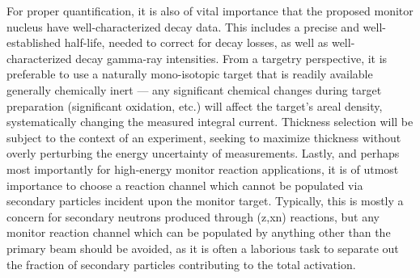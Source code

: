 \documentclass[3p]{elsarticle}
\newcommand{\comment}[1]{\todo[color=blue!20!white,inline]{ASV: #1}}
\begin{document}
For proper quantification, it is also of vital importance that the proposed monitor nucleus have well-characterized decay data.
This includes a precise and well-established half-life,  needed to  correct for decay losses, as well as well-characterized decay gamma-ray intensities.
From a targetry  perspective, it is preferable to use a naturally mono-isotopic target that is readily available
generally chemically inert --- any significant chemical changes during target preparation (significant oxidation, etc.) will affect the target's areal density, systematically changing the measured integral current. 
Thickness selection will be subject to the context of an experiment, seeking to maximize thickness without overly perturbing the energy uncertainty of  measurements.
Lastly, and perhaps most importantly for high-energy monitor reaction applications, it is  of utmost importance to choose a reaction channel which cannot be populated via secondary particles incident upon the monitor target.
Typically, this is  mostly a concern for secondary neutrons produced through (z,xn) reactions, 
but any monitor reaction channel which can be populated by anything other than the primary beam should be avoided, as it is often a laborious task to separate out the fraction of secondary particles contributing to the total activation.  
\end{document}
